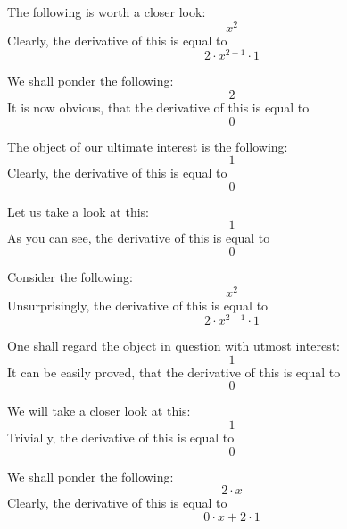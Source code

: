\documentclass{article}
\begin{document}
The following is worth a closer look:
\begin{equation}
x ^{2 } 
\end{equation}
Clearly, the derivative of this is equal to
\begin{equation}
2 \cdot x ^{2 - 1 } \cdot 1 
\end{equation}

We shall ponder the following:
\begin{equation}
2 
\end{equation}
It is now obvious, that the derivative of this is equal to
\begin{equation}
0 
\end{equation}

The object of our ultimate interest is the following:
\begin{equation}
1 
\end{equation}
Clearly, the derivative of this is equal to
\begin{equation}
0 
\end{equation}

Let us take a look at this:
\begin{equation}
1 
\end{equation}
As you can see, the derivative of this is equal to
\begin{equation}
0 
\end{equation}

Consider the following:
\begin{equation}
x ^{2 } 
\end{equation}
Unsurprisingly, the derivative of this is equal to
\begin{equation}
2 \cdot x ^{2 - 1 } \cdot 1 
\end{equation}

One shall regard the object in question with utmost interest:
\begin{equation}
1 
\end{equation}
It can be easily proved, that the derivative of this is equal to
\begin{equation}
0 
\end{equation}

We will take a closer look at this:
\begin{equation}
1 
\end{equation}
Trivially, the derivative of this is equal to
\begin{equation}
0 
\end{equation}

We shall ponder the following:
\begin{equation}
2 \cdot x 
\end{equation}
Clearly, the derivative of this is equal to
\begin{equation}
0 \cdot x + 2 \cdot 1 
\end{equation}
\end{document}
